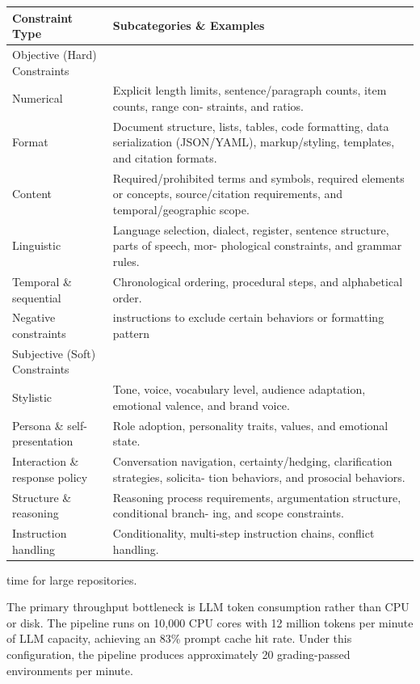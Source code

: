 \documentclass[
  10
]{article}
\newcounter{none} %
\begin{document}
{\def\LTcaptype{none} %
\begin{longtable}[]{@{}|l|l|@{}}
\toprule\noalign{}
\endhead
\bottomrule\noalign{}
\endlastfoot
\hline
Constraint Type & Subcategories \& Examples \\
\hline
Objective (Hard) Constraints & \\
\hline
Numerical & Explicit length limits, sentence/paragraph counts, item
counts, range con- straints, and ratios. \\
\hline
Format & Document structure, lists, tables, code formatting, data
serialization (JSON/YAML), markup/styling, templates, and citation
formats. \\
\hline
Content & Required/prohibited terms and symbols, required elements or
concepts, source/citation requirements, and temporal/geographic
scope. \\
\hline
Linguistic & Language selection, dialect, register, sentence structure,
parts of speech, mor- phological constraints, and grammar rules. \\
\hline
Temporal \& sequential & Chronological ordering, procedural steps, and
alphabetical order. \\
\hline
Negative constraints & instructions to exclude certain behaviors or
formatting pattern \\
\hline
Subjective (Soft) Constraints & \\
\hline
Stylistic & Tone, voice, vocabulary level, audience adaptation,
emotional valence, and brand voice. \\
\hline
Persona \& self-presentation & Role adoption, personality traits,
values, and emotional state. \\
\hline
Interaction \& response policy & Conversation navigation,
certainty/hedging, clarification strategies, solicita- tion behaviors,
and prosocial behaviors. \\
\hline
Structure \& reasoning & Reasoning process requirements, argumentation
structure, conditional branch- ing, and scope constraints. \\
\hline
Instruction handling & Conditionality, multi-step instruction chains,
conflict handling. \\
\hline
\end{longtable}
}

time for large repositories.

The primary throughput bottleneck is LLM token consumption rather than
CPU or disk. The pipeline runs on 10,000 CPU cores with 12 million
tokens per minute of LLM capacity, achieving an 83\% prompt cache hit
rate. Under this configuration, the pipeline produces approximately 20
grading-passed environments per minute.
\end{document}
